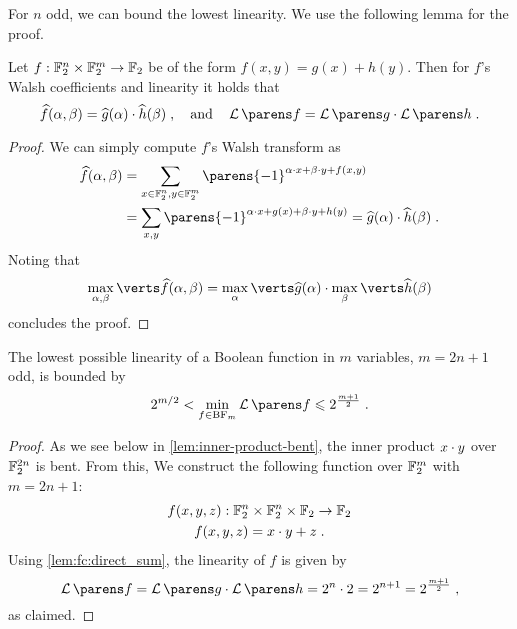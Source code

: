 For $n$ odd, we can bound the lowest linearity.
We use the following lemma for the proof.
\begin{lemma}\label{lem:fc:direct_sum}
    Let $f : \mathbb{F}_2^n \times \mathbb{F}_2^m \to \mathbb{F}_2$ be of the form $f(x, y) = g(x) + h(y)$.
    Then for $f$'s Walsh coefficients and linearity it holds that
    \begin{equation*}
        \FC{f}(\alpha, \beta) = \FC{g}(\alpha) \cdot \FC{h}(\beta)\;,
        \quad\text{and}\quad
        \linearity{f} = \linearity{g} \cdot \linearity{h}\;.
    \end{equation*}
\end{lemma}
\begin{proof}
    We can simply compute $f$'s Walsh transform as
    \begin{align*}
           \FC{f}(\alpha,\beta)
        &= \sum_{x \in \F_2^n, y \in \F_2^m} \parens{-1}^{\iprod{\alpha}{x} + \iprod{\beta}{y} + f(x,y)} \\
        &= \sum_{x, y} \parens{-1}^{\iprod{\alpha}{x} + g(x) + \iprod{\beta}{y} + h(y) }
         = \FC{g}(\alpha) \cdot \FC{h}(\beta)\;.
    \end{align*}
    Noting that
    \begin{equation*}
        \max_{\alpha, \beta} \abs{\FC{f}(\alpha, \beta)} = \max_\alpha \abs{\vphantom{\FC{h}}\FC{g}(\alpha)} \cdot \max_\beta \abs{\FC{h}(\beta)}
    \end{equation*}
    concludes the proof.
\end{proof}
\begin{proposition}
    The lowest possible linearity of a Boolean function in $m$ variables, $m = 2n+1$ odd, is bounded by
    \begin{equation*}
        2^{m/2} < \min_{f \in \boolfunc/_m} \linearity{f} \leqslant 2^{\frac{m+1}{2}}\;.
    \end{equation*}
\end{proposition}
\begin{proof}
    As we see below in \cref{lem:inner-product-bent}, the inner product $x \cdot y$ over $\mathbb{F}_2^{2n}$ is bent.
    From this, We construct the following function over $\mathbb{F}_2^{m}$ with $m = 2n+1$:
    \begin{gather*}
        f(x,y,z) : \mathbb{F}_2^n \times \mathbb{F}_2^n \times \mathbb{F}_2 \to \mathbb{F}_2 \\
        f(x,y,z) = x \cdot y + z\;.
    \end{gather*}
    Using \cref{lem:fc:direct_sum}, the linearity of $f$ is given by
    \begin{equation*}
        \linearity{f} = \linearity{g} \cdot \linearity{h} = 2^n \cdot 2 = 2^{n+1} = 2^{\frac{m+1}{2}}\;,
    \end{equation*}
    as claimed.
\end{proof}

